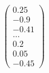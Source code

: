 \documentclass[preview]{standalone}
\begin{document}
\begin{align*}
\begin{pmatrix} 0.25 \\ -0.9 \\ -0.41 \\ \dots \\ 0.2 \\ 0.05 \\ -0.45 \end{pmatrix}
\end{align*}
\end{document}

